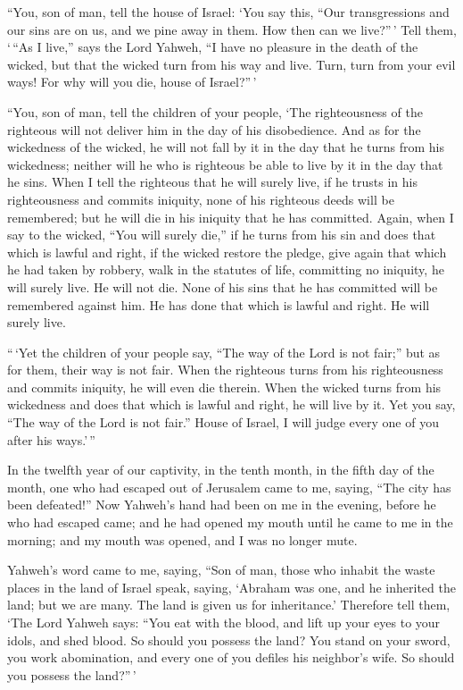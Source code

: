 ``You, son of man, tell the house of Israel: `You say
this, ``Our transgressions and our sins are on us, and we pine away in
them. How then can we live?''\,'  Tell them, `\,``As I
live,'' says the Lord Yahweh, ``I have no pleasure in the death of the
wicked, but that the wicked turn from his way and live. Turn, turn from
your evil ways! For why will you die, house of Israel?''\,'

 ``You, son of man, tell the children of your people,
`The righteousness of the righteous will not deliver him in the day of
his disobedience. And as for the wickedness of the wicked, he will not
fall by it in the day that he turns from his wickedness; neither will he
who is righteous be able to live by it in the day that he sins.
 When I tell the righteous that he will surely live, if
he trusts in his righteousness and commits iniquity, none of his
righteous deeds will be remembered; but he will die in his iniquity that
he has committed.  Again, when I say to the wicked, ``You
will surely die,'' if he turns from his sin and does that which is
lawful and right,  if the wicked restore the pledge, give
again that which he had taken by robbery, walk in the statutes of life,
committing no iniquity, he will surely live. He will not die.
 None of his sins that he has committed will be
remembered against him. He has done that which is lawful and right. He
will surely live.

 ``\,`Yet the children of your people say, ``The way of
the Lord is not fair;'' but as for them, their way is not fair.
 When the righteous turns from his righteousness and
commits iniquity, he will even die therein.  When the
wicked turns from his wickedness and does that which is lawful and
right, he will live by it.  Yet you say, ``The way of the
Lord is not fair.'' House of Israel, I will judge every one of you after
his ways.'\,''

 In the twelfth year of our captivity, in the tenth
month, in the fifth day of the month, one who had escaped out of
Jerusalem came to me, saying, ``The city has been defeated!''
 Now Yahweh's hand had been on me in the evening, before
he who had escaped came; and he had opened my mouth until he came to me
in the morning; and my mouth was opened, and I was no longer mute.

 Yahweh's word came to me, saying,  ``Son
of man, those who inhabit the waste places in the land of Israel speak,
saying, `Abraham was one, and he inherited the land; but we are many.
The land is given us for inheritance.'  Therefore tell
them, `The Lord Yahweh says: ``You eat with the blood, and lift up your
eyes to your idols, and shed blood. So should you possess the land?
 You stand on your sword, you work abomination, and every
one of you defiles his neighbor's wife. So should you possess the
land?''\,'

